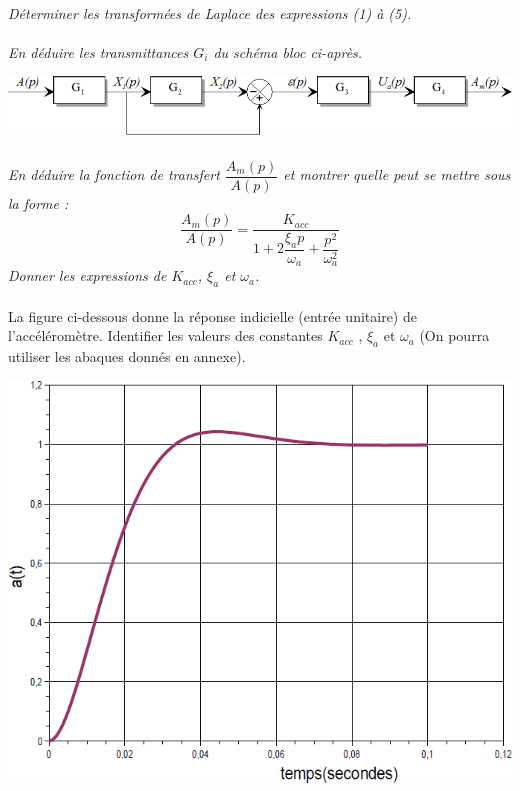 \documentclass[10pt,oneside]{article}
\begin{document}
\paragraph{}
\textit{Déterminer les transformées de Laplace des expressions (1) à (5).}

\paragraph{}
\textit{En déduire les transmittances $G_i$ du schéma bloc ci-après.}

\begin{center}
\includegraphics[width=.8\textwidth]{png/image14.png}
\end{center}

\paragraph{}
\textit{En déduire la fonction de transfert $\dfrac{A_m(p)}{A(p)}$ et montrer quelle peut se mettre sous la
forme :}
$$
\dfrac{A_m(p)}{A(p)} = \dfrac{K_{acc}}{1+2\dfrac{\xi_a p}{\omega_a} + \dfrac{p^2}{\omega_a^2}}
$$
\textit{Donner les expressions de $K_{acc}$, $\xi_a$ et $\omega_a$.}

\paragraph{}
La figure ci-dessous donne la réponse indicielle (entrée unitaire) de l'accéléromètre.
Identifier les valeurs des constantes $K_{acc}$ , $\xi_a$ et $\omega_a$ (On pourra utiliser les abaques donnés en annexe).


\begin{center}
\includegraphics[width=.8\textwidth]{png/image15.png}
\end{center}
\end{document}
